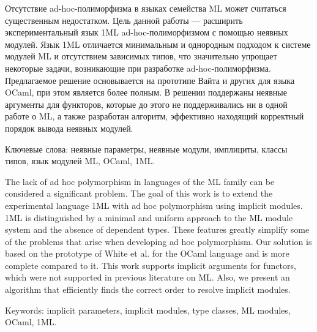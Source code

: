 \documentclass[../diploma.tex]{subfiles}
\begin{document}
Отсутствие ad-hoc-полиморфизма в языках семейства ML может считаться существенным недостатком. Цель данной работы --- расширить экспериментальный язык 1ML ad-hoc-полиморфизмом с помощью неявных модулей. Язык 1ML отличается минимальным и однородным подходом к системе модулей ML и отсутствием зависимых типов, что значительно упрощает некоторые задачи, возникающие при разработке ad-hoc-полиморфизма. Предлагаемое решение основывается на прототипе Вайта и других для языка OCaml, при этом является более полным. В решении поддержаны неявные аргументы для функторов, которые до этого не поддерживались ни в одной работе о ML, а также разработан алгоритм, эффективно находящий корректный порядок вывода неявных модулей.

\vspace*{\fill}

Ключевые слова: неявные параметры, неявные модули, имплициты, классы типов, язык модулей ML, OCaml, 1ML. 

\newpage

The lack of ad hoc polymorphism in languages ​​of the ML family can be considered a significant problem. The goal of this work is to extend the experimental language 1ML with ad hoc polymorphism using implicit modules. 1ML is distinguished by a minimal and uniform approach to the ML module system and the absence of dependent types. These features greatly simplify some of the problems that arise when developing ad hoc polymorphism. Our solution is based on the prototype of White et al. for the OCaml language and is more complete compared to it. This work supports implicit arguments for functors, which were not supported in previous literature on ML. Also, we present an algorithm that efficiently finds the correct order to resolve implicit modules.
\vspace*{\fill}

Keywords: implicit parameters, implicit modules, type classes, ML modules, OCaml, 1ML.
\end{document}
